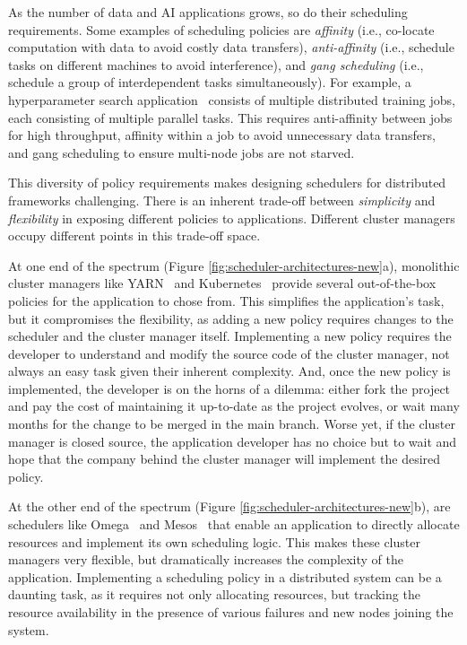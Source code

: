 As the number of data and AI applications grows, so do their scheduling requirements. 
Some examples of scheduling policies are \emph{affinity} (i.e., co-locate computation with data to avoid costly data transfers), \emph{anti-affinity}  (i.e., schedule tasks on different machines to avoid interference), 
and \emph{gang scheduling} (i.e., schedule a group of interdependent tasks simultaneously). For example, a hyperparameter search application~\cite{hypersched,gandiva} consists of multiple distributed training jobs, each consisting of multiple parallel tasks. This requires anti-affinity between jobs for high throughput, affinity within a job to avoid unnecessary data transfers, and gang scheduling to ensure multi-node jobs are not starved. 

This diversity of policy requirements makes designing schedulers for distributed frameworks challenging. There is an inherent trade-off between \emph{simplicity} and \emph{flexibility} in exposing different policies to applications. Different cluster managers occupy different points in this trade-off space. 

At one end of the spectrum (Figure \ref{fig:scheduler-architectures-new}a), monolithic cluster managers like YARN~\cite{yarn} and Kubernetes~\cite{kubernetes} provide several out-of-the-box policies for the application to chose from. This simplifies the application's task, but it compromises the flexibility, as adding a new policy requires changes to the scheduler and the cluster manager itself. Implementing a new policy requires the developer to understand and modify the source code of the cluster manager, not always an easy task given their inherent complexity. And, once the new policy is implemented, the developer is on the horns of a dilemma: either fork the project and pay the cost of maintaining it up-to-date as the project evolves, or wait many months for the change to be merged in the main branch. Worse yet, if the cluster manager is closed source, the application developer has no choice but to wait and hope that the company behind the cluster manager will implement the desired policy.

At the other end of the spectrum (Figure \ref{fig:scheduler-architectures-new}b), are schedulers like Omega~\cite{omega} and Mesos~\cite{mesos} that enable an application to directly allocate resources and implement its own scheduling logic. This makes these cluster managers very flexible, but dramatically increases the complexity of the application. Implementing a scheduling policy in a distributed system can be a daunting task, as it requires not only allocating resources, but tracking the resource availability in the presence of various failures and new nodes joining the system.

